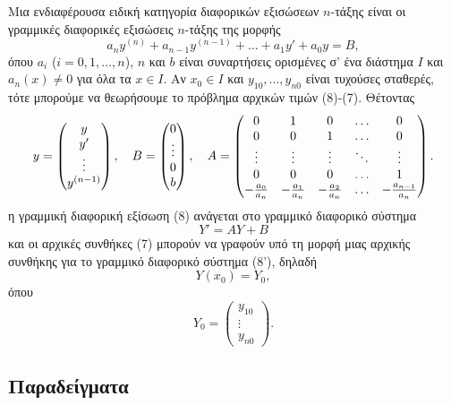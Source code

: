 \documentclass[a4paper,twoside,11pt]{book}
\DeclareRobustCommand{\frac}[3][0pt]{%
{\begingroup\hspace{#1}#2\hspace{#1}\endgroup\over\hspace{#1}#3\hspace{#1}}}
\begin{document}
Μια ενδιαφέρουσα ειδική κατηγορία διαφορικών εξισώσεων $n$-τάξης είναι οι γραμμικές διαφορικές εξισώσεις $n$-τάξης της μορφής
\begin{equation}
    a_n y^{(n)} + a_{n-1} y^{(n-1)} + \dots + a_1 y' + a_0 y = B,
\end{equation}
όπου $a_i$ ($i=0,1,\dots,n$), $n$ και $b$ είναι συναρτήσεις ορισμένες σ' ένα διάστημα $I$ και $a_n(x) \neq 0$ για όλα τα $x \in I$. Αν $x_0 \in I$ και $y_{10}, \dots, y_{n0}$ είναι τυχούσες σταθερές, τότε μπορούμε να θεωρήσουμε το πρόβλημα αρχικών τιμών (8)-(7). Θέτοντας
\[
    y = \begin{pmatrix} y \\ y' \\ \vdots \\ y^{(n-1)} \end{pmatrix}, \quad B = \begin{pmatrix} 0 \\ \vdots \\ 0 \\ b \end{pmatrix}, \quad A = \begin{pmatrix} 0 & 1 & 0 & \dots & 0 \\ 0 & 0 & 1 & \dots & 0 \\ \vdots & \vdots & \vdots & \ddots & \vdots \\ 0 & 0 & 0 & \dots & 1 \\ -\frac{a_0}{a_n} & -\frac{a_1}{a_n} & -\frac{a_2}{a_n} & \dots & -\frac{a_{n-1}}{a_n} \end{pmatrix}.
\]
η γραμμική διαφορική εξίσωση (8) ανάγεται στο γραμμικό διαφορικό σύστημα
\begin{equation*} \label{eq:8prime}
    Y' = AY+B \tag{8'}
\end{equation*}
και οι αρχικές συνθήκες (7) μπορούν να γραφούν υπό τη μορφή μιας αρχικής συνθήκης για το γραμμικό διαφορικό σύστημα (8'), δηλαδή
\begin{equation*} \label{eq:7primeprime}
    Y(x_0) = Y_0, \tag{7''}
\end{equation*}
όπου
\[
    Y_0 = \begin{pmatrix} y_{10} \\ \vdots \\ y_{n0} \end{pmatrix}.
\]

\subsection{Παραδείγματα}
\end{document}
